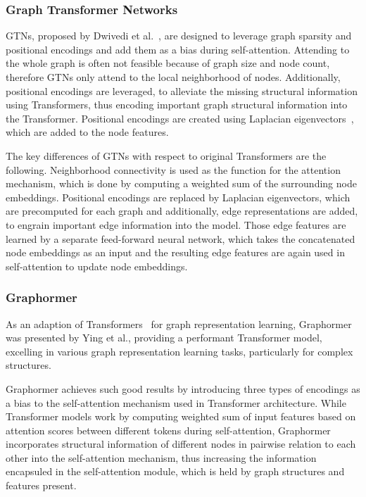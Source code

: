 \subsubsection{Graph Transformer Networks}
GTNs, proposed by Dwivedi et al.~\cite{dwivedi2021generalizationTransformer}, are designed to leverage graph sparsity and positional encodings and add them as a bias during self-attention. Attending to the whole graph is often not feasible because of graph size and node count, therefore GTNs only attend to the local neighborhood of nodes. Additionally, positional encodings are leveraged, to alleviate the missing structural information using Transformers, thus encoding important graph structural information into the Transformer. Positional encodings are created using Laplacian eigenvectors~\cite{belkin2003laplacian}, which are added to the node features.

The key differences of GTNs with respect to original Transformers are the following. Neighborhood connectivity is used as the function for the attention mechanism, which is done by computing a weighted sum of the surrounding node embeddings. Positional encodings are replaced by Laplacian eigenvectors, which are precomputed for each graph and additionally, edge representations are added, to engrain important edge information into the model. Those edge features are learned by a separate feed-forward neural network, which takes the concatenated node embeddings as an input and the resulting edge features are again used in self-attention to update node embeddings.


\subsubsection{Graphormer}
As an adaption of Transformers~\cite{vaswani2017attention} for graph representation learning, Graphormer~\cite{2021graphormer} was presented by Ying et al., providing a performant Transformer model, excelling in various graph representation learning tasks, particularly for complex structures.

Graphormer achieves such good results by introducing three types of encodings as a bias to the self-attention mechanism used in Transformer architecture. While Transformer models work by computing weighted sum of input features based on attention scores between different tokens during self-attention, Graphormer incorporates structural information of different nodes in pairwise relation to each other into the self-attention mechanism, thus increasing the information encapsuled in the self-attention module, which is held by graph structures and features present.

